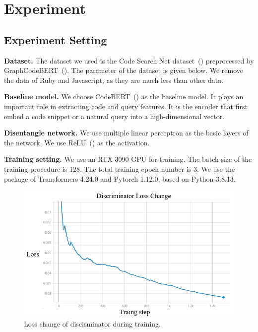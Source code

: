 
\section{Experiment}
\label{sec:exp}

\subsection{Experiment Setting}
\noindent\textbf{Dataset.} The dataset we used is the Code Search Net dataset~(\citealp{CodeSearchNet}) 
preprocessed by GraphCodeBERT~(\citealp{GraphCodeBERT}). 
The parameter of the dataset is given below. We remove the data of Ruby and Javascript, 
as they are much less than other data. 

\noindent\textbf{Baseline model.} We choose CodeBERT~(\citealp{CodeBERT}) as the baseline model. 
It plays an important role in extracting code and query features. 
It is the encoder that first embed a code snippet or a natural query into a high-dimensional vector. 

\noindent\textbf{Disentangle network.} We use multiple linear perceptron as the basic 
layers of the network. We use ReLU~(\citealp{agarap2018deep}) as the activation. 

\noindent\textbf{Training setting.} We use an RTX 3090 GPU for training. 
The batch size of the training procedure is 128. The total training epoch number is 3. 
We use the package of Transformers 4.24.0 and Pytorch 1.12.0, based on Python 3.8.13.

\begin{figure}[htb]
	\centering
	\includegraphics[width=1\linewidth]{imgs/discri_loss.png}
	\caption{Loss change of discirminator during training.}
	\label{fig:disloss}
\end{figure}


